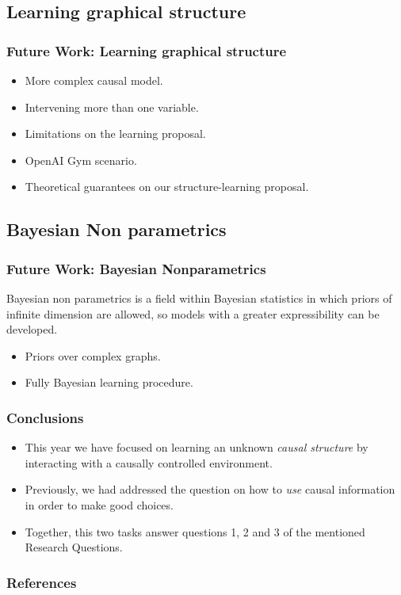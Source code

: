 \documentclass{beamer}
\theoremstyle{plain}
\begin{document}
\subsection{Learning graphical structure}
\begin{frame}
\frametitle{Future Work: Learning graphical structure}
\begin{itemize}
\item More complex causal model.
\item Intervening more than one variable.
\item Limitations on the learning proposal.
\item OpenAI Gym scenario.
\item Theoretical guarantees on our structure-learning proposal.
\end{itemize} 
\end{frame}

\subsection{Bayesian Non parametrics}
\begin{frame}
\frametitle{Future Work: Bayesian Nonparametrics}
Bayesian non parametrics is a field within Bayesian statistics in which priors of infinite dimension are allowed, so models with a greater expressibility can be developed.
\begin{itemize}
\item Priors over complex graphs.
\item Fully Bayesian learning procedure.
\end{itemize}
\end{frame}

\begin{frame}
\frametitle{Conclusions}
\begin{itemize}
\item This year we have focused on learning an unknown \textit{causal structure} by interacting with a causally controlled environment.
\item Previously, we had addressed the question on how to \textit{use} causal information in order to make good choices. 
\item Together, this two tasks answer questions 1, 2 and 3 of the mentioned Research Questions.
\end{itemize}
\end{frame}

\begin{frame}[allowframebreaks]
\frametitle{References}


\end{frame}
\end{document}
